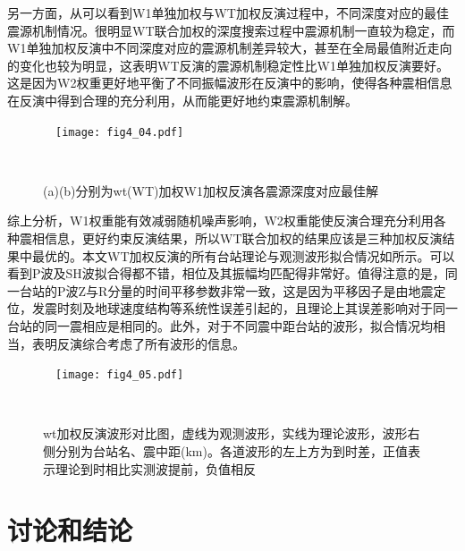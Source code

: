 另一方面，从可以看到W1单独加权与WT加权反演过程中，不同深度对应的最佳震源机制情况。很明显WT联合加权的深度搜索过程中震源机制一直较为稳定，而W1单独加权反演中不同深度对应的震源机制差异较大，甚至在全局最值附近走向的变化也较为明显，这表明WT反演的震源机制稳定性比W1单独加权反演要好。这是因为W2权重更好地平衡了不同振幅波形在反演中的影响，使得各种震相信息在反演中得到合理的充分利用，从而能更好地约束震源机制解。
\begin{figure}
\centering
  \texttt{[image: fig4\_04.pdf]}
  \caption{ (a)(b)分别为wt(WT)加权W1加权反演各震源深度对应最佳解}
  \label{fig4_04}
\end{figure}

综上分析，W1权重能有效减弱随机噪声影响，W2权重能使反演合理充分利用各种震相信息，更好约束反演结果，所以WT联合加权的结果应该是三种加权反演结果中最优的。本文WT加权反演的所有台站理论与观测波形拟合情况如所示。可以看到P波及SH波拟合得都不错，相位及其振幅均匹配得非常好。值得注意的是，同一台站的P波Z与R分量的时间平移参数非常一致，这是因为平移因子是由地震定位，发震时刻及地球速度结构等系统性误差引起的，且理论上其误差影响对于同一台站的同一震相应是相同的。此外，对于不同震中距台站的波形，拟合情况均相当，表明反演综合考虑了所有波形的信息。
\begin{figure}
\centering
  \texttt{[image: fig4\_05.pdf]}
  \caption{ wt加权反演波形对比图，虚线为观测波形，实线为理论波形，波形右侧分别为台站名、震中距(km)。各道波形的左上方为到时差，正值表示理论到时相比实测波提前，负值相反}
  \label{fig4_05}
\end{figure}

\section{讨论和结论}

